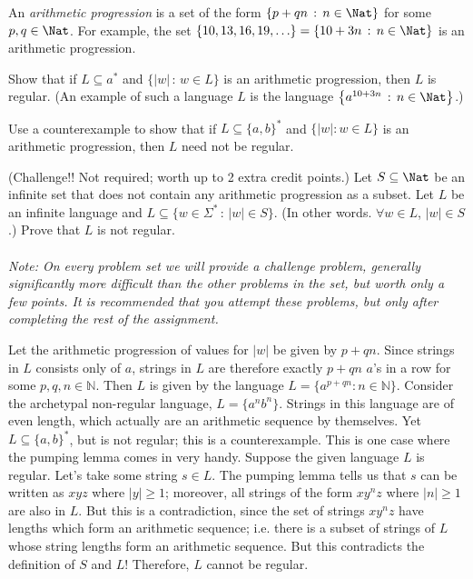 \documentclass[solution, letterpaper]{cs121}
\begin{document}
An \emph{arithmetic progression} is a set of the form $\{p+qn \,:\, n \in \Nat\}$ for some $p,q \in \Nat$. For example, the set $\{10,13,16,19,\ldots\} = \{10+3n \,:\, n \in \Nat\}$ is an arithmetic progression.

\subproblem  Show that if $L \subseteq a^*$ and $\{|w| \,:\, w \in L\}$ is an arithmetic progression, then $L$ is regular. (An example of such a language $L$ is the language $\left\{a^{10+3n} \,:\, n \in \Nat\right\}$.)

\subproblem Use a counterexample to show that if $L \subseteq \{a,b\}^*$ and $\{|w| : w \in L\}$ is an arithmetic progression, then $L$ need not be regular.

\subproblem (Challenge!! Not required; worth up to 2 extra credit points.) Let $S \subseteq \Nat$ be an infinite set that does not contain any arithmetic progression as a subset. Let $L$ be an infinite language and $L \subseteq \{w \in \Sigma^* \,:\, |w| \in S\}$. (In other words. $\forall w \in L$, $|w| \in S$.) Prove that $L$ is not regular.\\\\
\textit{Note: On every problem set we will provide a challenge problem, generally significantly more difficult than the other problems in the set, but worth only a few points. It is recommended that you attempt these problems, but only after completing the rest of the assignment.}

\begin{solution}
\subsolution Let the arithmetic progression of values for $|w|$ be given by $p + qn$.  Since strings in $L$ consists only of $a$, strings in $L$ are therefore exactly $p + qn$ $a$'s in a row for some $p, q, n \in \mathbb{N}$.  Then $L$ is given by the language $L = \{a^{p+qn}: n \in \mathbb{N}\}$.
\subsolution Consider the archetypal non-regular language, $L = \{a^nb^n\}$.  Strings in this language are of even length, which actually are an arithmetic sequence by themselves.  Yet $L \subseteq \{a,b\}^*$, but is not regular; this is a counterexample.
\subsolution This is one case where the pumping lemma comes in very handy.  Suppose the given language $L$ is regular.  Let's take some string $s \in L$.  The pumping lemma tells us that $s$ can be written as $xyz$ where $|y| \ge 1$; moreover, all strings of the form $xy^nz$ where $|n| \ge 1$ are also in $L$.  But this is a contradiction, since the set of strings $xy^nz$ have lengths which form an arithmetic sequence; i.e. there is a subset of strings of $L$ whose string lengths form an arithmetic sequence.  But this contradicts the definition of $S$ and $L$!  Therefore, $L$ cannot be regular.
\end{solution}
\end{document}
